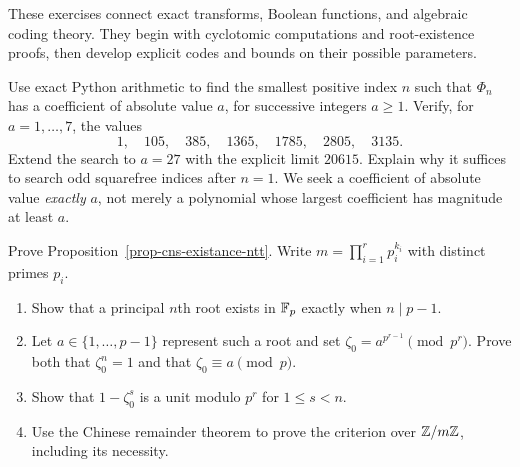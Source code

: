 These exercises connect exact transforms, Boolean functions, and algebraic
coding theory. They begin with cyclotomic computations and root-existence
proofs, then develop explicit codes and bounds on their possible parameters.


\begin{exo}
\label{exo-calculus-pol-cyclotomic}
Use exact Python arithmetic to find the smallest positive index $n$ such
that $\Phi_n$ has a coefficient of absolute value $a$, for successive
integers $a\geq1$. Verify, for $a=1,\ldots,7$, the values
\[
 1,\quad105,\quad385,\quad1365,\quad1785,\quad2805,\quad3135.
\]
Extend the search to $a=27$ with the explicit limit $20615$.
Explain why it suffices to search odd squarefree
indices after $n=1$. We seek a coefficient of absolute value \emph{exactly}
$a$, not merely a polynomial whose largest coefficient has magnitude
at least $a$.
\end{exo}


\begin{exo}
\label{exo-demo-cns-existance-ntt}
Prove Proposition~\ref{prop-cns-existance-ntt}. Write
$m=\prod_{i=1}^r p_i^{k_i}$ with distinct primes $p_i$.
\begin{enumerate}
\item Show that a principal $n$th root exists in $\mathbb{F}_p$ exactly when
$n\mid p-1$.
\item Let $a\in\{1,\ldots,p-1\}$ represent such a root and set
$\zeta_0=a^{p^{r-1}}\pmod {p^r}$. Prove both that $\zeta_0^n=1$
and that $\zeta_0\equiv a\pmod p$.
\item Show that $1-\zeta_0^s$ is a unit modulo $p^r$ for $1\leq s<n$.
\item Use the Chinese remainder theorem to prove the criterion over
$\mathbb{Z}/m\mathbb{Z}$, including its necessity.
\end{enumerate}
\end{exo}



